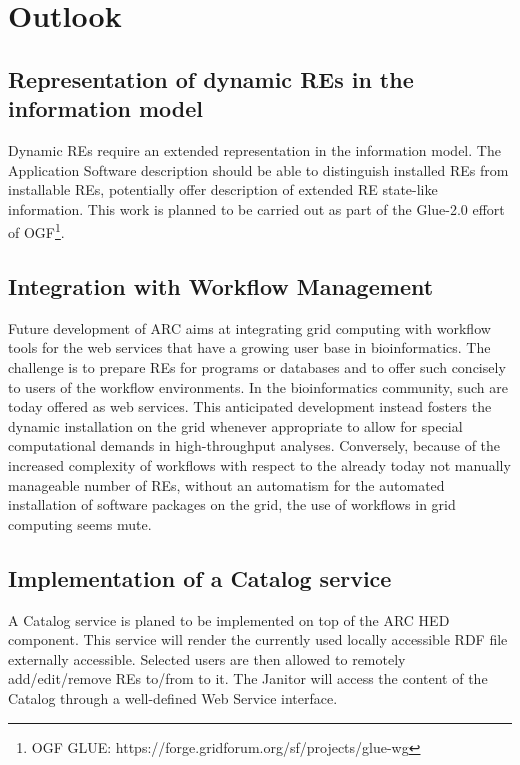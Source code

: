 \chapter{Outlook}
% 
% 

\section{Representation of dynamic REs in the information model}
Dynamic REs require an extended representation in the
information model.  The Application Software description should be able
to distinguish installed REs from installable REs, potentially offer
description of extended RE state-like information. This work is planned
to be carried out as part of the Glue-2.0 effort of OGF\footnote{OGF
GLUE: https://forge.gridforum.org/sf/projects/glue-wg}.

\section{Integration with Workflow Management}

Future development of ARC aims at integrating grid computing with
workflow tools for the web services that have a growing user base in
bioinformatics. The challenge is to prepare REs for
programs or databases and to offer such concisely to users of the
workflow environments.  In the bioinformatics community, such are
today offered as web services.  This anticipated development instead
fosters the dynamic installation on the grid whenever appropriate to
allow for special computational demands in high-throughput analyses.
Conversely, because of the increased complexity of workflows with respect
to the already today not manually manageable number of REs, without an
automatism for the automated installation of software packages on the
grid, the use of workflows in grid computing seems mute.

\section{Implementation of a Catalog service}
 
A Catalog service is planed to be implemented on top of the ARC
HED component.  This service will render the currently used locally
accessible RDF file externally accessible. Selected users are then allowed
to remotely add/edit/remove REs to/from to it.  The Janitor will access
the content of the Catalog through a well-defined Web Service interface.

